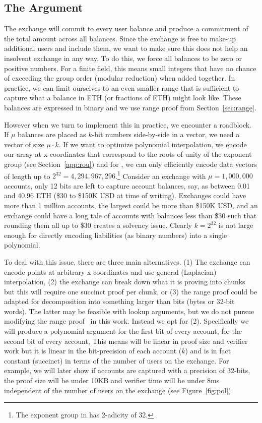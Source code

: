 \subsection{The \pol Argument}
\label{sec:pol}

The exchange will commit to every user balance and produce a commitment of the total amount across all balances. Since the exchange is free to make-up additional users and include them, we want to make sure this does not help an insolvent exchange in any way. To do this, we force all balances to be zero or positive numbers. For a finite field, this means small integers that have no chance of exceeding the group order (modular reduction) when added together. In practice, we can limit ourselves to an even smaller range that is sufficient to capture what a balance in ETH (or fractions of ETH) might look like. These balances are expressed in binary and we use range proof from Section~\ref{sec:range}.

However when we turn to implement this in practice, we encounter a roadblock. If $\mu$ balances are placed as $k$-bit numbers side-by-side in a vector, we need a vector of size $\mu \cdot k$. If we want to optimize polynomial interpolation, we encode our array at x-coordinates that correspond to the roots of unity of the exponent group (see Section~\ref{app:rou}) and for \bls, we can only efficiently encode data vectors of length up to \(2^{32}=4,294,967,296\).\footnote{The exponent group in \bls has 2-adicity of 32.} Consider an exchange with $\mu=1,000,000$ accounts, only 12 bits are left to capture account balances, say, as between 0.01 and 40.96 ETH (\$30 to \$150K USD at time of writing). Exchanges could have more than 1 million accounts, the largest could be more than \$150K USD, and an exchange could have a long tale of accounts with balances less than \$30 such that rounding them all up to \$30 creates a solvency issue. Clearly \(k=2^{32}\) is not large enough for directly encoding liabilities (as binary numbers) into a single polynomial.



To deal with this issue, there are three main alternatives. (1) The exchange can encode points at arbitrary x-coordinates and use general (Laplacian) interpolation, (2) the exchange can break down what it is proving into chunks but this will require one succinct proof per chunk, or (3) the range proof could be adapted for decomposition into something larger than bits (\eg bytes or 32-bit words). The latter may be feasible with lookup arguments, but we do not pursue modifying the range proof~\cite{rangeproof} in this work. Instead we opt for (2). Specifically we will produce a polynomial argument for the first bit of every account, for the second bit of every account, \etc This means \pol will be linear in proof size and verifier work but it is linear in the bit-precision of each account ($k$) and is in fact constant (succinct) in terms of the number of users on the exchange. For example, we will later show if accounts are captured with a precision of 32-bits, the proof size will be under 10KB and verifier time will be under 8ms independent of the number of users on the exchange (see Figure~\ref{fig:pol}).

